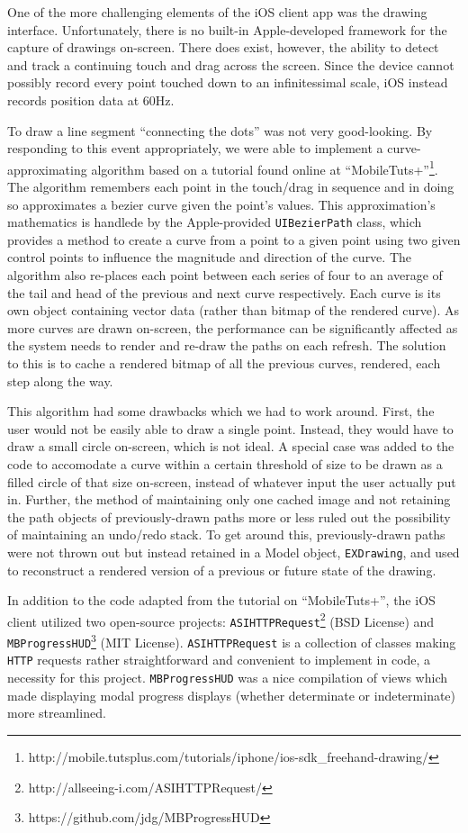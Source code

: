 \documentclass{acm_proc_article-sp}
\begin{document}
One of the more challenging elements of the iOS client app was the drawing interface. Unfortunately, there is no built-in Apple-developed framework for the capture of drawings on-screen. There does exist, however, the ability to detect and track a continuing touch and drag across the screen. Since the device cannot possibly record every point touched down to an infinitessimal scale, iOS instead records position data at 60Hz.

To draw a line segment ``connecting the dots'' was not very good-looking. By responding to this event appropriately, we were able to implement a curve-approximating algorithm based on a tutorial found online at ``MobileTuts+''\footnote{http://mobile.tutsplus.com/tutorials/iphone/ios-sdk\_freehand-drawing/}. The algorithm remembers each point in the touch/drag in sequence and in doing so approximates a bezier curve given the point's values. This approximation's mathematics is handlede by the Apple-provided \texttt{UIBezierPath} class, which provides a method to create a curve from a point to a given point using two given control points to influence the magnitude and direction of the curve. The algorithm also re-places each point between each series of four to an average of the tail and head of the previous and next curve respectively. Each curve is its own object containing vector data (rather than bitmap of the rendered curve). As more curves are drawn on-screen, the performance can be significantly affected as the system needs to render and re-draw the paths on each refresh. The solution to this is to cache a rendered bitmap of all the previous curves, rendered, each step along the way. 

This algorithm had some drawbacks which we had to work around. First, the user would not be easily able to draw a single point. Instead, they would have to draw a small circle on-screen, which is not ideal. A special case was added to the code to accomodate a curve within a certain threshold of size to be drawn as a filled circle of that size on-screen, instead of whatever input the user actually put in. Further, the method of maintaining only one cached image and not retaining the path objects of previously-drawn paths more or less ruled out the possibility of maintaining an undo/redo stack. To get around this, previously-drawn paths were not thrown out but instead retained in a Model object, \texttt{EXDrawing}, and used to reconstruct a rendered version of a previous or future state of the drawing.

In addition to the code adapted from the tutorial on ``MobileTuts+'', the iOS client utilized two open-source projects: \texttt{ASIHTTPRequest}\footnote{http://allseeing-i.com/ASIHTTPRequest/} (BSD License) and \texttt{MBProgressHUD}\footnote{https://github.com/jdg/MBProgressHUD} (MIT License). \texttt{ASIHTTPRequest} is a collection of classes making \texttt{HTTP} requests rather straightforward and convenient to implement in code, a necessity for this project. \texttt{MBProgressHUD} was a nice compilation of views which made displaying modal progress displays (whether determinate or indeterminate) more streamlined.
\end{document}
